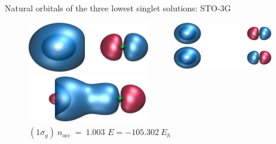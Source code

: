 \documentclass[10pt]{beamer}
\begin{document}

\begin{frame}{Natural orbitals of the three lowest singlet solutions:  STO-3G}
  \begin{figure}
    \begin{columns}[b]
      
      \begin{column}{0.31\textwidth}
        \includegraphics[width=0.9\textwidth]{Figures/lifr5_adiab_mo7.cube.png}
        \caption*{\centering $(2\sigma_g)~n_\text{occ}~=~0.566423$}
        \includegraphics[width=0.9\textwidth]{Figures/lifr5_adiab_mo6.cube.png}
        \caption*{\centering $(1\sigma_g)~n_\text{occ}~=~1.43358$
        $E=-105.316~E_h$}
      \end{column}

      \begin{column}{0.31\textwidth}
        \includegraphics[width=0.9\textwidth]{Figures/lifr12_adiab_mo7.cube.png}
        \caption*{\centering $(1\sigma_u)~n_\text{occ}~=~0.997$}
        \includegraphics[width=0.9\textwidth]{Figures/lifr12_adiab_mo6.cube.png}
        \caption*{\centering $(1\sigma_g)~n_\text{occ}~=~1.003$
        $E=-105.302~E_h$}
      \end{column}

    \end{columns}
  \end{figure}
\end{frame}
\end{document}

